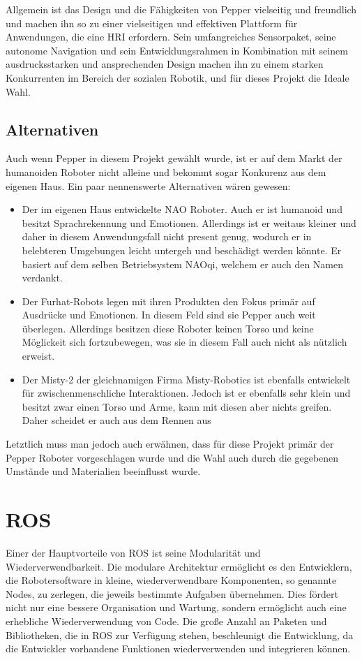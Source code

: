 Allgemein ist das Design und die Fähigkeiten von Pepper vielseitig und freundlich und machen ihn so zu einer vielseitigen und effektiven Plattform für Anwendungen, die eine \ac{HRI} erfordern. Sein umfangreiches Sensorpaket, seine autonome Navigation und sein Entwicklungsrahmen in Kombination mit seinem ausdrucksstarken und ansprechenden Design machen ihn zu einem starken Konkurrenten im Bereich der sozialen Robotik, und für dieses Projekt die Ideale Wahl.

\subsection{Alternativen}
Auch wenn Pepper in diesem Projekt gewählt wurde, ist er auf dem Markt der humanoiden Roboter nicht alleine und bekommt sogar Konkurenz aus dem eigenen Haus. Ein paar nennenswerte Alternativen wären gewesen:
\begin{itemize}
    \item Der im eigenen Haus entwickelte NAO Roboter. Auch er ist humanoid und besitzt Sprachrekennung und Emotionen. Allerdings ist er weitaus kleiner und daher in diesem Anwendungsfall nicht present genug, wodurch er in belebteren Umgebungen leicht untergeh und beschädigt werden könnte. Er basiert auf dem selben Betriebsystem NAOqi, welchem er auch den Namen verdankt.
    \item Der Furhat-Robots legen mit ihren Produkten den Fokus primär auf Ausdrücke und Emotionen. In diesem Feld sind sie Pepper auch weit überlegen. Allerdings besitzen diese Roboter keinen Torso und keine Möglickeit sich fortzubewegen, was sie in diesem Fall auch nicht als nützlich erweist.
    \item Der Misty-2 der gleichnamigen Firma Misty-Robotics ist ebenfalls entwickelt für zwischenmenschliche Interaktionen. Jedoch ist er ebenfalls sehr klein und besitzt zwar einen Torso und Arme, kann mit diesen aber nichts greifen. Daher scheidet er auch aus dem Rennen aus
\end{itemize}
Letztlich muss man jedoch auch erwähnen, dass für diese Projekt primär der Pepper Roboter vorgeschlagen wurde und die Wahl auch durch die gegebenen Umstände und Materialien beeinflusst wurde.

\section{ROS}
Einer der Hauptvorteile von \ac{ROS} ist seine Modularität und Wiederverwendbarkeit. Die modulare Architektur ermöglicht es den Entwicklern, die Robotersoftware in kleine, wiederverwendbare Komponenten, so genannte Nodes, zu zerlegen, die jeweils bestimmte Aufgaben übernehmen. Dies fördert nicht nur eine bessere Organisation und Wartung, sondern ermöglicht auch eine erhebliche Wiederverwendung von Code. Die große Anzahl an Paketen und Bibliotheken, die in ROS zur Verfügung stehen, beschleunigt die Entwicklung, da die Entwickler vorhandene Funktionen wiederverwenden und integrieren können.
\\

